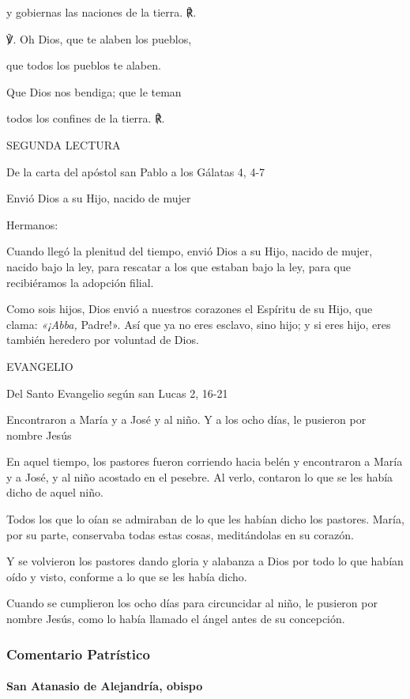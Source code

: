 \documentclass[]{article}
\let\oldparagraph\paragraph
\renewcommand{\paragraph}[1]{\oldparagraph{#1}\mbox{}}
\begin{document}
y gobiernas las naciones de la tierra. ℟.

℣. Oh Dios, que te alaben los pueblos,

que todos los pueblos te alaben.

Que Dios nos bendiga; que le teman

todos los confines de la tierra. ℟.

SEGUNDA LECTURA

De la carta del apóstol san Pablo a los Gálatas 4, 4-7

Envió Dios a su Hijo, nacido de mujer

Hermanos:

Cuando llegó la plenitud del tiempo, envió Dios a su Hijo, nacido de
mujer, nacido bajo la ley, para rescatar a los que estaban bajo la ley,
para que recibiéramos la adopción filial.

Como sois hijos, Dios envió a nuestros corazones el Espíritu de su Hijo,
que clama: \emph{«¡Abba,} Padre!». Así que ya no eres esclavo, sino
hijo; y si eres hijo, eres también heredero por voluntad de Dios.

EVANGELIO

Del Santo Evangelio según san Lucas 2, 16-21

Encontraron a María y a José y al niño. Y a los ocho días, le pusieron
por nombre Jesús

En aquel tiempo, los pastores fueron corriendo hacia belén y encontraron
a María y a José, y al niño acostado en el pesebre. Al verlo, contaron
lo que se les había dicho de aquel niño.

Todos los que lo oían se admiraban de lo que les habían dicho los
pastores. María, por su parte, conservaba todas estas cosas,
meditándolas en su corazón.

Y se volvieron los pastores dando gloria y alabanza a Dios por todo lo
que habían oído y visto, conforme a lo que se les había dicho.

Cuando se cumplieron los ocho días para circuncidar al niño, le pusieron
por nombre Jesús, como lo había llamado el ángel antes de su concepción.

\protect\hypertarget{_Toc448662833}{}{}

\subsubsection{Comentario Patrístico}\label{comentario-patruxedstico-9}

\paragraph{San Atanasio de Alejandría,
obispo}\label{san-atanasio-de-alejandruxeda-obispo}
\end{document}
